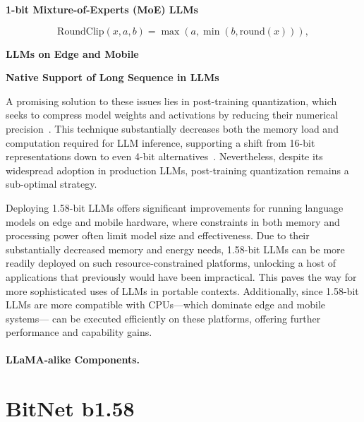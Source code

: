 \textbf{1-bit Mixture-of-Experts (MoE) LLMs}

\begin{equation}
    \mathrm{RoundClip}(x, a, b) = \max(a, \min(b, \mathrm{round}(x))),
\end{equation}

\textbf{LLMs on Edge and Mobile}

\textbf{Native Support of Long Sequence in LLMs}

A promising solution to these issues lies in post-training quantization, which seeks to compress model weights and activations by reducing their numerical precision~\cite{smoothquant, gptq, quip, quip_sharp}. This technique substantially decreases both the memory load and computation required for LLM inference, supporting a shift from 16-bit representations down to even 4-bit alternatives~\cite{gptq, awq}. Nevertheless, despite its widespread adoption in production LLMs, post-training quantization remains a sub-optimal strategy.

Deploying 1.58-bit LLMs offers significant improvements for running language models on edge and mobile hardware, where constraints in both memory and processing power often limit model size and effectiveness. Due to their substantially decreased memory and energy needs, 1.58-bit LLMs can be more readily deployed on such resource-constrained platforms, unlocking a host of applications that previously would have been impractical. This paves the way for more sophisticated uses of LLMs in portable contexts. Additionally, since 1.58-bit LLMs are more compatible with CPUs—which dominate edge and mobile systems— can be executed efficiently on these platforms, offering further performance and capability gains.

\paragraph{LLaMA-alike Components.}

\section{BitNet b1.58}
